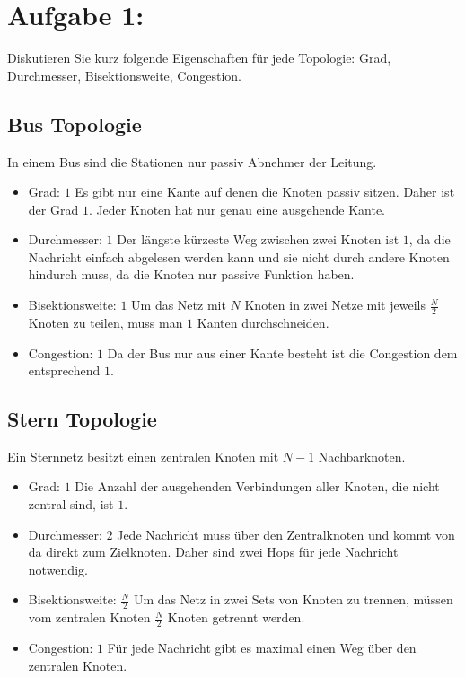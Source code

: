 \section{Aufgabe 1:}
Diskutieren Sie kurz folgende Eigenschaften für jede Topologie: Grad,
Durchmesser, Bisektionsweite, Congestion.
\subsection{Bus Topologie}
In einem Bus sind die Stationen nur passiv Abnehmer der Leitung.
\begin{itemize}
  \item Grad: $1$
  \newline Es gibt nur eine Kante auf denen die Knoten passiv sitzen. Daher
  ist der Grad $1$. Jeder Knoten hat nur genau eine ausgehende Kante.
  \item Durchmesser: $1$
   \newline Der längste kürzeste Weg zwischen zwei Knoten ist $1$, da die
   Nachricht einfach abgelesen werden kann und sie nicht durch andere Knoten
   hindurch muss, da die Knoten nur passive Funktion haben.
  \item Bisektionsweite: $1$
  \newline  Um das Netz mit $N$ Knoten in zwei Netze mit jeweils $\frac{N}{2}$
  Knoten zu teilen, muss man $1$ Kanten durchschneiden.
  \item Congestion: $1$
  \newline Da der Bus nur aus einer Kante besteht ist die Congestion dem entsprechend $1$.
\end{itemize}

\subsection{Stern Topologie}
Ein Sternnetz besitzt einen zentralen Knoten mit $N-1$ Nachbarknoten.

\begin{itemize}
  \item Grad: $1$ \newline Die Anzahl der ausgehenden Verbindungen aller
  Knoten, die nicht zentral sind, ist $1$.
  \item Durchmesser: $2$ \newline Jede Nachricht muss über den Zentralknoten und
  kommt von da direkt zum Zielknoten. Daher sind zwei Hops für jede Nachricht notwendig.
  \item Bisektionsweite: $\frac{N}{2}$ \newline Um das Netz in zwei Sets von Knoten zu trennen, müssen vom zentralen Knoten $\frac{N}{2}$ Knoten getrennt werden.
  \item Congestion: $1$ \newline Für jede Nachricht gibt es maximal einen Weg über den zentralen Knoten.
\end{itemize}

